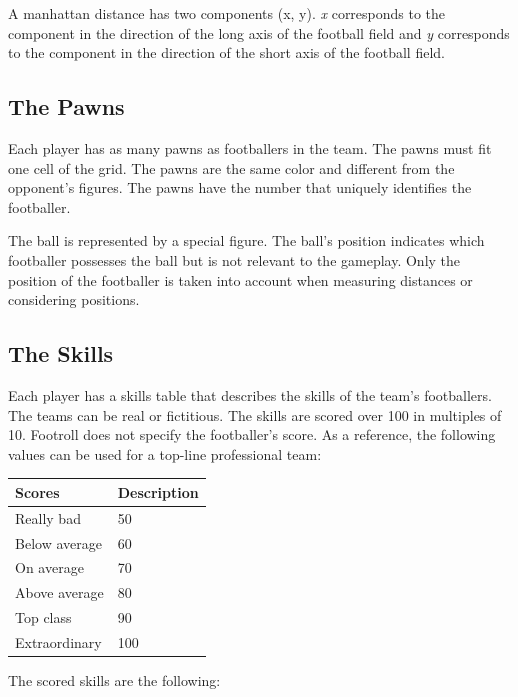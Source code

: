\documentclass[12pt]{article}
\begin{document}
A manhattan distance has two components (x, y). \emph{x }corresponds to the component in the direction of the long axis of the football field and \emph{y }corresponds to the component in the direction of the short axis of the football field.

\subsection{The Pawns}

Each player has as many pawns as footballers in the team. The pawns must fit one cell of the grid. The pawns are the same color and different from the opponent's figures. The pawns have the number that uniquely identifies the footballer.

The ball is represented by a special figure. The ball's position indicates which footballer possesses the ball but is not relevant to the gameplay. Only the position of the footballer is taken into account when measuring distances or considering positions.

\subsection{\textbf{The Skills}}

Each player has a skills table that describes the skills of the team's footballers. The teams can be real or fictitious. The skills are scored over 100 in multiples of 10. Footroll does not specify the footballer's score. As a reference, the following values can be used for a top-line professional team:

\begin{center}
\begin{tabular}{ll}
\toprule
\textbf{Scores} & \textbf{Description} \\
\midrule
Really bad & 50 \\
Below average & 60 \\
On average & 70 \\
Above average & 80 \\
Top class & 90 \\
Extraordinary & 100 \\
\bottomrule
\end{tabular}
\end{center}

The scored skills are the following:
\end{document}
